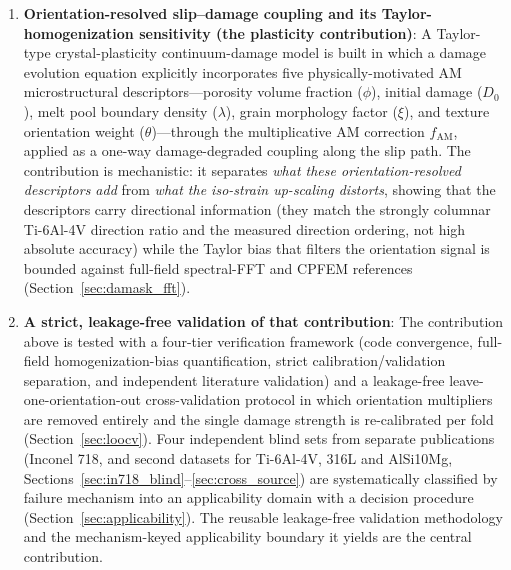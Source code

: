 \documentclass[12pt,a4paper,twocolumn]{article}
\begin{document}
\begin{enumerate}\def\labelenumi{(\arabic{enumi})}
    \item \textbf{Orientation-resolved slip--damage coupling and its Taylor-homogenization sensitivity (the plasticity contribution)}: A Taylor-type crystal-plasticity continuum-damage model is built in which a damage evolution equation explicitly incorporates five physically-motivated AM microstructural descriptors---porosity volume fraction ($\phi$), initial damage ($D_0$), melt pool boundary density ($\lambda$), grain morphology factor ($\xi$), and texture orientation weight ($\theta$)---through the multiplicative AM correction $f_{\text{AM}}$, applied as a one-way damage-degraded coupling along the slip path. The contribution is mechanistic: it separates \emph{what these orientation-resolved descriptors add} from \emph{what the iso-strain up-scaling distorts}, showing that the descriptors carry directional information (they match the strongly columnar Ti-6Al-4V direction ratio and the measured direction ordering, not high absolute accuracy) while the Taylor bias that filters the orientation signal is bounded against full-field spectral-FFT and CPFEM references (Section~\ref{sec:damask_fft}).
    
    \item \textbf{A strict, leakage-free validation of that contribution}: The contribution above is tested with a four-tier verification framework (code convergence, full-field homogenization-bias quantification, strict calibration/validation separation, and independent literature validation) and a leakage-free leave-one-orientation-out cross-validation protocol in which orientation multipliers are removed entirely and the single damage strength is re-calibrated per fold (Section~\ref{sec:loocv}). Four independent blind sets from separate publications (Inconel 718, and second datasets for Ti-6Al-4V, 316L and AlSi10Mg, Sections~\ref{sec:in718_blind}--\ref{sec:cross_source}) are systematically classified by failure mechanism into an applicability domain with a decision procedure (Section~\ref{sec:applicability}). The reusable leakage-free validation methodology and the mechanism-keyed applicability boundary it yields are the central contribution.
    

\end{enumerate}
\end{document}
